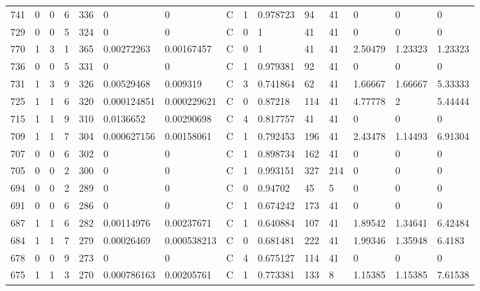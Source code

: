 \begin{latin}
\begin{longtable}{lllllllllllllll}
	741 & 0  & 0   & 6  & 336 & 0              & 0              & C & 1  & 0.978723 & 94   & 41   & 0       & 0       & 0       \\
	729 & 0  & 0   & 5  & 324 & 0              & 0              & C & 0  & 1        & 41   & 41   & 0       & 0       & 0       \\
	770 & 1  & 3   & 1  & 365 & 0.00272263     & 0.00167457     & C & 0  & 1        & 41   & 41   & 2.50479 & 1.23323 & 1.23323 \\
	736 & 0  & 0   & 5  & 331 & 0              & 0              & C & 1  & 0.979381 & 92   & 41   & 0       & 0       & 0       \\
	731 & 1  & 3   & 9  & 326 & 0.00529468     & 0.009319       & C & 3  & 0.741864 & 62   & 41   & 1.66667 & 1.66667 & 5.33333 \\
	725 & 1  & 1   & 6  & 320 & 0.000124851    & 0.000229621    & C & 0  & 0.87218  & 114  & 41   & 4.77778 & 2       & 5.44444 \\
	715 & 1  & 1   & 9  & 310 & 0.0136652      & 0.00290698     & C & 4  & 0.817757 & 41   & 41   & 0       & 0       & 0       \\
	709 & 1  & 1   & 7  & 304 & 0.000627156    & 0.00158061     & C & 1  & 0.792453 & 196  & 41   & 2.43478 & 1.14493 & 6.91304 \\
	707 & 0  & 0   & 6  & 302 & 0              & 0              & C & 1  & 0.898734 & 162  & 41   & 0       & 0       & 0       \\
	705 & 0  & 0   & 2  & 300 & 0              & 0              & C & 1  & 0.993151 & 327  & 214  & 0       & 0       & 0       \\
	694 & 0  & 0   & 2  & 289 & 0              & 0              & C & 0  & 0.94702  & 45   & 5    & 0       & 0       & 0       \\
	691 & 0  & 0   & 6  & 286 & 0              & 0              & C & 1  & 0.674242 & 173  & 41   & 0       & 0       & 0       \\
	687 & 1  & 1   & 6  & 282 & 0.00114976     & 0.00237671     & C & 1  & 0.640884 & 107  & 41   & 1.89542 & 1.34641 & 6.42484 \\
	684 & 1  & 1   & 7  & 279 & 0.00026469     & 0.000538213    & C & 0  & 0.681481 & 222  & 41   & 1.99346 & 1.35948 & 6.4183  \\
	678 & 0  & 0   & 9  & 273 & 0              & 0              & C & 4  & 0.675127 & 114  & 41   & 0       & 0       & 0       \\
	675 & 1  & 1   & 3  & 270 & 0.000786163    & 0.00205761     & C & 1  & 0.773381 & 133  & 8    & 1.15385 & 1.15385 & 7.61538 \\

\end{longtable}
\end{latin}
